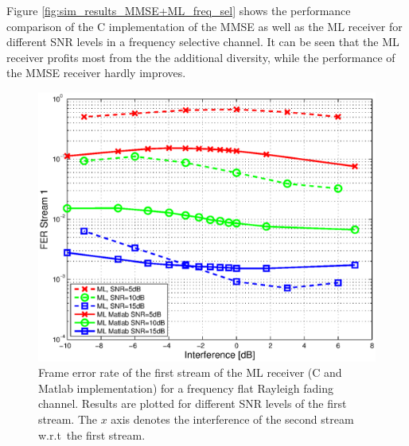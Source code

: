 \documentclass[a4paper,twocolumn,journal]{IEEEtran}
\begin{document}
Figure \ref{fig:sim_results_MMSE+ML_freq_sel} shows the performance comparison of the C implementation of the MMSE as well as the ML receiver for different SNR levels in a frequency selective channel. It can be seen that the ML receiver profits most from the the additional diversity, while the performance of the MMSE receiver hardly improves.
   
\begin{figure}
 \includegraphics[width=\columnwidth]{figures/sim_results_ML_C+matlab}
 \caption{Frame error rate of the first stream of the ML receiver (C and Matlab implementation) for a frequency flat Rayleigh fading channel. Results are plotted for different SNR levels of the first stream. The $x$ axis denotes the interference of the second stream w.r.t\ the first stream.}
\label{fig:sim_results_ML}
\end{figure}
\end{document}
